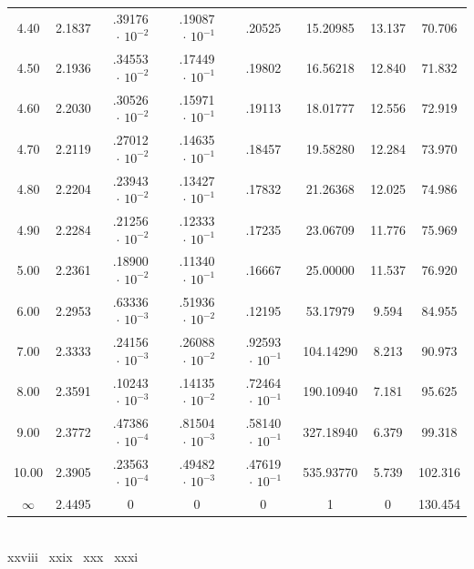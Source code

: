 \begin{minipage}{0.525\textwidth}
{\begin{tabular}{c|c|c|c|c|c|c|c}
        4.40 & 2.1837 & .39176$\,\cdot\,10^{-2}$ & .19087$\,\cdot\,10^{-1}$ & .20525 & 15.20985 & 13.137 & 70.706 \\
        4.50 & 2.1936 & .34553$\,\cdot\,10^{-2}$ & .17449$\,\cdot\,10^{-1}$ & .19802 & 16.56218 & 12.840 & 71.832 \\
        4.60 & 2.2030 & .30526$\,\cdot\,10^{-2}$ & .15971$\,\cdot\,10^{-1}$ & .19113 & 18.01777 & 12.556 & 72.919 \\
        4.70 & 2.2119 & .27012$\,\cdot\,10^{-2}$ & .14635$\,\cdot\,10^{-1}$ & .18457 & 19.58280 & 12.284 & 73.970 \\
        4.80 & 2.2204 & .23943$\,\cdot\,10^{-2}$ & .13427$\,\cdot\,10^{-1}$ & .17832 & 21.26368 & 12.025 & 74.986 \\
        4.90 & 2.2284 & .21256$\,\cdot\,10^{-2}$ & .12333$\,\cdot\,10^{-1}$ & .17235 & 23.06709 & 11.776 & 75.969 \\
        5.00 & 2.2361 & .18900$\,\cdot\,10^{-2}$ & .11340$\,\cdot\,10^{-1}$ & .16667 & 25.00000 & 11.537 & 76.920 \\
        6.00 & 2.2953 & .63336$\,\cdot\,10^{-3}$ & .51936$\,\cdot\,10^{-2}$ & .12195 & 53.17979 & 9.594 & 84.955 \\
        7.00 & 2.3333 & .24156$\,\cdot\,10^{-3}$ & .26088$\,\cdot\,10^{-2}$ & .92593$\,\cdot\,10^{-1}$ & 104.14290 & 8.213 & 90.973 \\
        8.00 & 2.3591 & .10243$\,\cdot\,10^{-3}$ & .14135$\,\cdot\,10^{-2}$ & .72464$\,\cdot\,10^{-1}$ & 190.10940 & 7.181 & 95.625 \\
        9.00 & 2.3772 & .47386$\,\cdot\,10^{-4}$ & .81504$\,\cdot\,10^{-3}$ & .58140$\,\cdot\,10^{-1}$ & 327.18940 & 6.379 & 99.318 \\
        10.00 & 2.3905 & .23563$\,\cdot\,10^{-4}$ & .49482$\,\cdot\,10^{-3}$ & .47619$\,\cdot\,10^{-1}$ & 535.93770 & 5.739 & 102.316 \\
        $\infty$ & 2.4495 & 0 & 0 & 0 & 1 & 0 & 130.454
    \end{tabular}
    }
\end{minipage} \\ \vspace{4mm}
{\color{RubineRed}xxviii} \textbar\ {\color{RoyalPurple}xxix} \textbar\ {\color{Bittersweet}xxx} \textbar\ {\color{Emerald}xxxi}

\newpage
